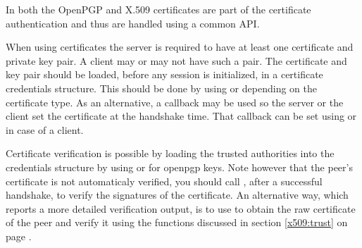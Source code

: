 In \gnutls{} both the OpenPGP and X.509 certificates are part of the
certificate authentication and thus are handled using a common API.
\par
When using certificates the server is required
to have at least one certificate and private key pair. A client
may or may not have such a pair. The certificate and key pair
should be loaded, before any \tls{} session is initialized,
in a certificate credentials structure. This should be done by using
or
depending on the certificate type. As an alternative, a callback may be used
so the server or the client set the certificate at the handshake time.
That callback can be set using
or
in case of a client.
\par
Certificate verification is possible by loading the trusted authorities
into the credentials structure by using
or
for openpgp keys. Note however that the peer's certificate is not automaticaly verified,
you should call ,
after a successful handshake,
to verify the signatures of the certificate. An alternative way, which reports
a more detailed verification output, is to use
 to obtain
the raw certificate of the peer and verify it using the functions discussed in
section \ref{x509:trust} on page \pageref{x509:trust}. 

